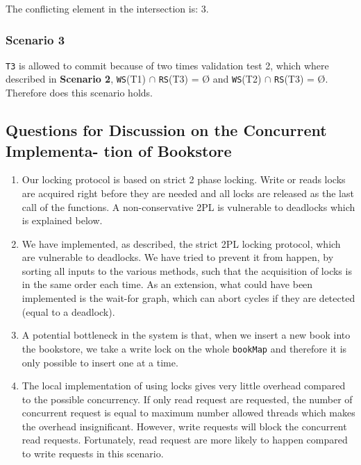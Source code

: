 \documentclass[10pt,a4paper]{article}
\begin{document}
The conflicting element in the intersection is: 3.

\subsubsection*{Scenario 3}
\texttt{T3} is allowed to commit because of two times validation test 2, which where described in \textbf{Scenario 2}, \texttt{WS}(T1) $\cap$ \texttt{RS}(T3) = Ø and \texttt{WS}(T2) $\cap$ \texttt{RS}(T3) = Ø. Therefore does this scenario holds.

\subsection*{Questions for Discussion on the Concurrent Implementa- tion of Bookstore}

\begin{enumerate}
	\item Our locking protocol is based on strict 2 phase locking. Write or reads locks are acquired right before they are needed and all locks are released as the last call of the functions. A non-conservative 2PL is vulnerable to deadlocks which is explained below.
	\item We have implemented, as described, the strict 2PL locking protocol, which are vulnerable to deadlocks. We have tried to prevent it from happen, by sorting all inputs to the various methods, such that the acquisition of locks is in the same order each time. As an extension, what could have been implemented is the wait-for graph, which can abort cycles if they are detected (equal to a deadlock).
	\item A potential bottleneck in the system is that, when we insert a new book into the bookstore, we take a write lock on the whole \texttt{bookMap} and therefore it is only possible to insert one at a time. 
	\item The local implementation of using locks gives very little overhead compared to the possible concurrency. If only read request are requested, the number of concurrent request is equal to maximum number allowed threads which makes the overhead insignificant. However, write requests will block the concurrent read requests. Fortunately, read request are more likely to happen compared to write requests in this scenario.
\end{enumerate}
\end{document}
